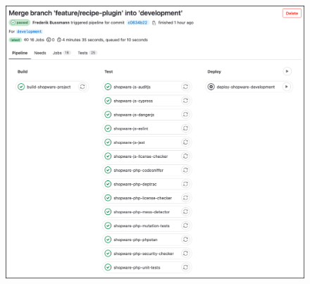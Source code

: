 \begin{figure}[H]
    \centering
    \includegraphics[width=\textwidth]{images/content/job-overview}
    \label{fig:job-overview}
\end{figure}
